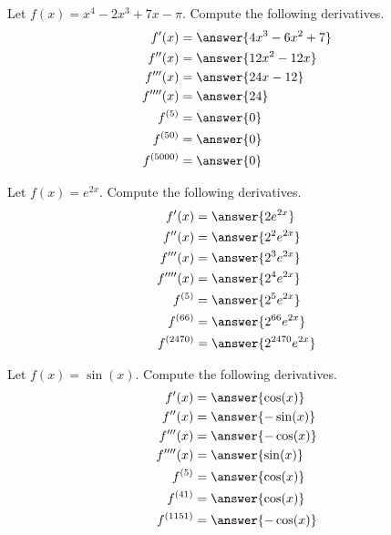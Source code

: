 \documentclass{ximera}
\author{Nela Lakos \and Kyle Parsons}
\begin{document}
\begin{exercise}

Let $f(x) = x^4 -2x^3 + 7x - \pi$.  Compute the following derivatives.
\begin{align*}
f'(x) &= \answer{4x^3 - 6x^2 + 7}\\
f''(x) &= \answer{12x^2 - 12x}\\
f'''(x) &= \answer{24x - 12}\\
f''''(x) &= \answer{24}\\
f^{(5)} &= \answer{0}\\
f^{(50)} &= \answer{0}\\
f^{(5000)} &= \answer{0}\\
\end{align*}

\begin{exercise}

Let $\displaystyle{f(x) = e^{2x}}$.  Compute the following derivatives.
\begin{align*}
f'(x) &= \answer{2e^{2x}}\\
f''(x) &= \answer{2^2 e^{2x}}\\
f'''(x) &= \answer{2^3 e^{2x}}\\
f''''(x) &= \answer{2^4 e^{2x}}\\
f^{(5)} &= \answer{2^5 e^{2x}}\\
f^{(66)} &= \answer{2^{66} e^{2x}}\\
f^{(2470)} &= \answer{2^{2470} e^{2x}}\\
\end{align*}

\begin{exercise}

Let $f(x) = \sin(x)$.  Compute the following derivatives.
\begin{align*}
f'(x) &= \answer{\cos(x)}\\
f''(x) &= \answer{-\sin(x)}\\
f'''(x) &= \answer{-\cos(x)}\\
f''''(x) &= \answer{\sin(x)}\\
f^{(5)} &= \answer{\cos(x)}\\
f^{(41)} &= \answer{\cos(x)}\\
f^{(1151)} &= \answer{-\cos(x)}\\
\end{align*}

\end{exercise}
\end{exercise}
\end{exercise}
\end{document}
